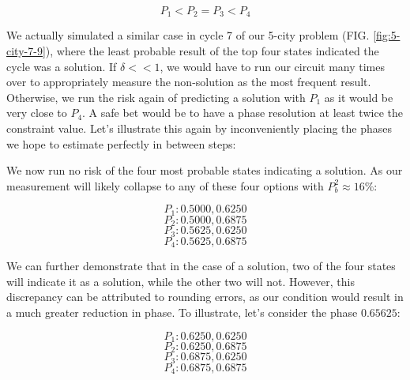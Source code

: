 \documentclass[msc,oneside]{ubcthesis}
\begin{document}
 $$P_1 < P_2 = P_3 < P_4$$
 
We actually simulated a similar case in cycle 7 of our 5-city problem (FIG. \ref{fig:5-city-7-9}), where the least probable result of the top four states indicated the cycle was a solution. If $\delta << 1$, we would have to run our circuit many times over to appropriately measure the non-solution as the most frequent result. Otherwise, we run the risk again of predicting a solution with $P_1$ as it would be very close to $P_4$. A safe bet would be to have a phase resolution at least twice the constraint value. Let's illustrate this again by inconveniently placing the phases we hope to estimate perfectly in between steps:
 
 
 We now run no risk of the four most probable states indicating a solution. As our measurement will likely collapse to any of these four options with $P^2_b \approx 16\%$:
 
 $$P_1: 0.5000, 0.6250$$
 $$P_2: 0.5000, 0.6875$$
 $$P_3: 0.5625, 0.6250$$
 $$P_4: 0.5625, 0.6875$$
 
We can further demonstrate that in the case of a solution, two of the four states will indicate it as a solution, while the other two will not. However, this discrepancy can be attributed to rounding errors, as our condition would result in a much greater reduction in phase. To illustrate, let's consider the phase $0.65625$:



$$P_1: 0.6250, 0.6250$$
$$P_2: 0.6250, 0.6875$$
$$P_3: 0.6875, 0.6250$$
$$P_4: 0.6875, 0.6875$$
\end{document}
